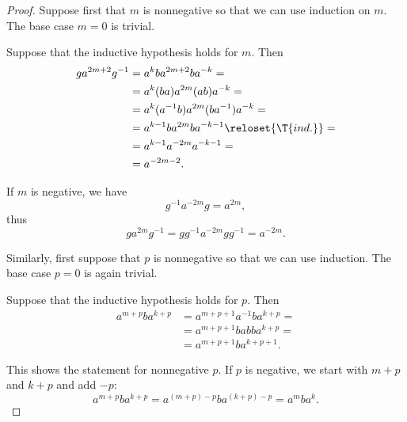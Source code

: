 \begin{proof}
   Suppose first that \( m \) is nonnegative so that we can use induction on \( m \). The base case \( m = 0 \) is trivial.

  Suppose that the inductive hypothesis holds for \( m \). Then
  \begin{align*}
    g a^{2m+2} g^{-1}
    &=
    a^k b a^{2m+2} b a^{-k}
    = \\ &=
    a^k (b a) a^{2m} (a b) a^{-k}
    = \\ &=
    a^k (a^{-1} b) a^{2m} (b a^{-1}) a^{-k}
    = \\ &=
    a^{k-1} b a^{2m} b a^{-k-1}
    \reloset {\T{ind.}} = \\ &=
    a^{k-1} a^{-2m} a^{-k-1}
    = \\ &=
    a^{-2m-2}.
  \end{align*}

  If \( m \) is negative, we have
  \begin{equation*}
    g^{-1} a^{-2m} g = a^{2m},
  \end{equation*}
  thus
  \begin{equation*}
    g a^{2m} g^{-1} = g g^{-1} a^{-2m} g g^{-1} = a^{-2m}.
  \end{equation*}

   Similarly, first suppose that \( p \) is nonnegative so that we can use induction. The base case \( p = 0 \) is again trivial.

  Suppose that the inductive hypothesis holds for \( p \). Then
  \begin{align*}
    a^{m+p} b a^{k+p}
    &=
    a^{m+p+1} a^{-1} b a^{k+p}
    = \\ &=
    a^{m+p+1} b a b b a^{k+p}
    = \\ &=
    a^{m+p+1} b a^{k+p+1}.
  \end{align*}

  This shows the statement for nonnegative \( p \). If \( p \) is negative, we start with \( m + p \) and \( k + p \) and add \( -p \):
  \begin{equation*}
    a^{m+p} b a^{k+p} = a^{(m+p)-p} b a^{(k+p)-p} = a^m b a^k.
  \end{equation*}
\end{proof}

